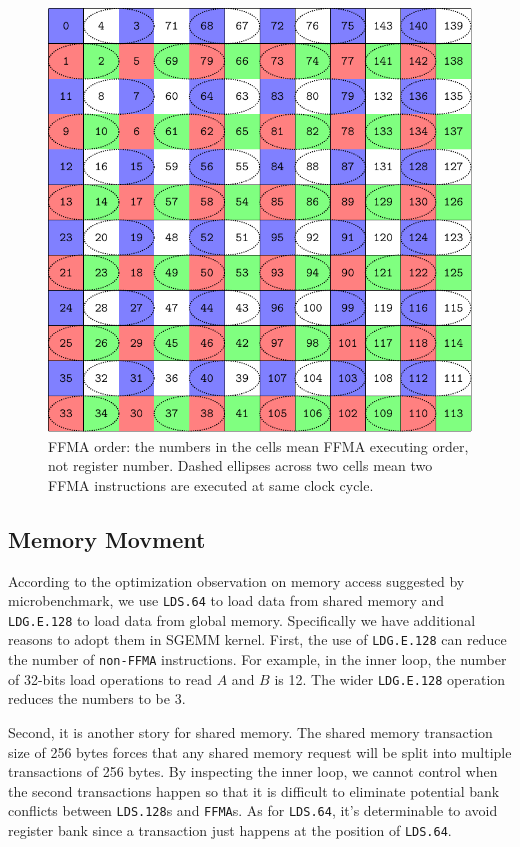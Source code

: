 \documentclass{sig-alternate-05-2015}
\begin{document}
\begin{figure}[htbp]
\begin{center}
\includegraphics[scale=0.6]{order}
\caption{FFMA order: the numbers in the cells mean FFMA executing order, not register number.
Dashed ellipses across two cells mean two FFMA instructions are executed at same clock cycle. }
\label{fig:order}
\end{center}
\end{figure}

\subsection{Memory Movment}
According to the optimization observation on memory access suggested by microbenchmark, we use {\tt LDS.64} to load data from shared memory and {\tt LDG.E.128} to load data from global memory. Specifically we have additional reasons to adopt them in SGEMM kernel. First, the use of {\tt LDG.E.128} can reduce the number of {\tt non-FFMA} instructions. For example,  in the inner loop, the number of 32-bits load operations to read $A$ and $B$ is 12. The wider {\tt LDG.E.128} operation reduces the numbers to be 3. 

Second, it is another story for shared memory. The shared memory transaction size of 256 bytes forces that any shared memory request will be split into multiple transactions of 256 bytes. By inspecting the inner loop, we cannot control when the second transactions happen so that it is difficult to eliminate potential bank conflicts between {\tt LDS.128}s and {\tt FFMA}s. As for {\tt LDS.64}, it's determinable to avoid register bank since a transaction just happens at the position of {\tt LDS.64}. 
\end{document}
